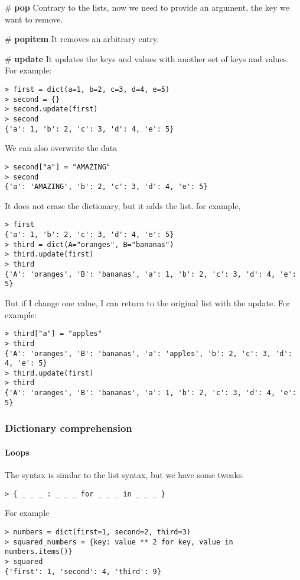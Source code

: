 \# {\bf pop} Contrary to the lists, now we need to provide an argument, the key we want to remove. 

\# {\bf popitem} It removes an arbitrary entry.

\# {\bf update} It updates the keys and values with another set of keys and values. For example:
\begin{verbatim}
> first = dict(a=1, b=2, c=3, d=4, e=5)
> second = {}
> second.update(first)
> second 
{'a': 1, 'b': 2, 'c': 3, 'd': 4, 'e': 5}
\end{verbatim}

We can also overwrite the data
\begin{verbatim}
> second["a"] = "AMAZING"
> second 
{'a': 'AMAZING', 'b': 2, 'c': 3, 'd': 4, 'e': 5}
\end{verbatim}

It does not erase the dictionary, but it adds the list. for example,
\begin{verbatim}
> first 
{'a': 1, 'b': 2, 'c': 3, 'd': 4, 'e': 5}
> third = dict(A="oranges", B="bananas")
> third.update(first)
> third
{'A': 'oranges', 'B': 'bananas', 'a': 1, 'b': 2, 'c': 3, 'd': 4, 'e': 5}
\end{verbatim}

But if I change one value, I can return to the original list with the update. For example:
\begin{verbatim}
> third["a"] = "apples"
> third
{'A': 'oranges', 'B': 'bananas', 'a': 'apples', 'b': 2, 'c': 3, 'd': 4, 'e': 5}
> third.update(first)
> third
{'A': 'oranges', 'B': 'bananas', 'a': 1, 'b': 2, 'c': 3, 'd': 4, 'e': 5}
\end{verbatim}


\subsubsection{Dictionary comprehension}

\paragraph{Loops}

The syntax is similar to the list syntax, but we have some tweaks.
\begin{verbatim}
> { _ _ _ : _ _ _ for _ _ _ in _ _ _ }
\end{verbatim}
For example
\begin{verbatim}
> numbers = dict(first=1, second=2, third=3)
> squared_numbers = {key: value ** 2 for key, value in numbers.items()}
> squared
{'first': 1, 'second': 4, 'third': 9}
\end{verbatim}

